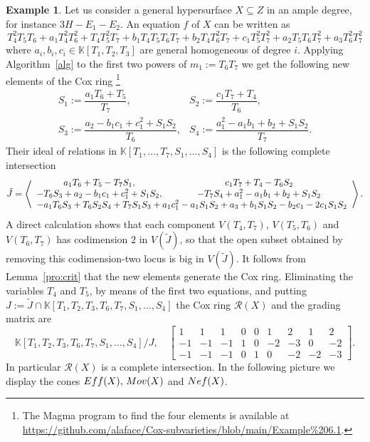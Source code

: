 \documentclass{amsart}
\theoremstyle{definition}
\newtheorem{example}[theorem]{Example}
\theoremstyle{remark}
\begin{document}
\begin{example}
Let us consider a general hypersurface
$X\subseteq Z$ in an ample degree, for
instance $3H-E_1-E_2$. An equation $f$
of $X$ can be written as
{\small
\[
 T_4^2T_5T_6 + a_1T_4^2T_6^2 + T_4T_5^2T_7 + b_1T_4T_5T_6T_7 + b_2T_4T_6^2T_7 +
    c_1T_5^2T_7^2 + a_2T_5T_6T_7^2 + a_3T_6^2T_7^2
\]}
where $a_i,b_i,c_i\in\mathbb K[T_1,T_2,T_3]$
are general homogeneous of degree $i$.
Applying Algorithm~\ref{alg} to the
first two powers of $m_1 := T_6T_7$ we get
the following new elements of the Cox ring
\footnote{The Magma program to find the four elements is available at
\url{https://github.com/alaface/Cox-subvarieties/blob/main/Example\%206.1}.}
\[
\begin{array}{ll}
 S_1 :=  \dfrac{a_1T_6 + T_5}{T_7},
 &
 S_2 :=  \dfrac{c_1T_7 + T_4}{T_6},\\[2mm]
 S_3 := \dfrac{a_2 - b_1c_1 + c_1^2 + S_1S_2}
 {T_6},
 & S_4 := \dfrac{a_1^2 - a_1b_1 + b_2 + S_1S_2}{T_7}.
 \end{array}
\]
Their ideal of relations in
$\mathbb K[T_1,\dots,T_7,S_1,\dots,S_4]$
is the following complete intersection
{\small
\[
    \tilde J = \left\langle
    \begin{array}{cc}
    a_1 T_6 + T_5 - T_7 S_1, & c_1 T_7 + T_4 - T_6 S_2 \\
    -T_6 S_3 + a_2 - b_1 c_1 + c_1^2 + S_1 S_2,
    & -T_7 S_4 + a_1^2 - a_1 b_1 + b_2 + S_1 S_2 \\
    \multicolumn{2}{l}{-a_1 T_6 S_3 + T_6 S_2 S_4 + T_7 S_1 S_3 + a_1 c_1^2 - a_1 S_1 S_2 + a_3 + b_1 S_1 S_2 - b_2 c_1 - 2 c_1 S_1 S_2}
\end{array}
    \right\rangle.
\]}
A direct calculation shows that each component
$V(T_4,T_7)$, $V(T_5,T_6)$ and $V(T_6,T_7)$
has codimension $2$ in $V(\tilde J)$, so that
the open subset obtained by removing this codimension-two locus is big in $V(\tilde J)$.
It follows from Lemma~\ref{pro:crit} that
the new elements generate the Cox ring.
Eliminating
the variables $T_4$ and $T_5$, by means of the
first two equations, and putting
$J := \tilde J \cap \mathbb K[T_1,T_2,T_3,T_6,T_7,S_1,\dots,S_4]$
the Cox ring $\mathcal R(X)$
and the grading matrix are
\[
\mathbb K[T_1,T_2,T_3,T_6,T_7,S_1,\dots,S_4]
/J,
\quad
\left[
\begin{array}{rrrrrrrrr}
1 & 1 & 1 & 0 & 0 & 1 & 2 & 1 & 2\\
-1 & -1 & -1 & 1 & 0 & -2 & -3 & 0 & -2\\
-1 & -1 & -1 & 0 & 1 & 0 & -2 & -2 & -3
\end{array}
\right].
\]
In particular $\mathcal R(X)$ is a complete
intersection. In the following picture
we display the cones ${\rm Eff}(X),\,
{\rm Mov}(X)$ and ${\rm Nef}(X)$.


\end{example}
\end{document}
